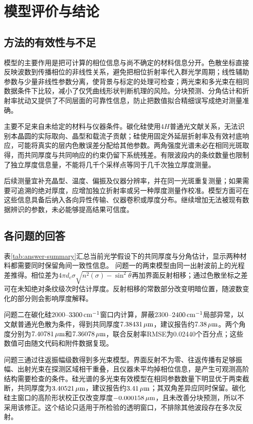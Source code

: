 \section{模型评价与结论}
\subsection{方法的有效性与不足}
模型的主要作用是把可计算的相位信息与尚不确定的材料信息分开。色散坐标直接反映波数到传播相位的非线性关系，避免把相位折射率代入群光学周期；线性辅助参数与少量非线性参数分离，使背景与标定的处理可检查；两光束和多光束在相同数据条件下比较，减小了仅凭曲线形状判断机理的风险。分块预测、分角估计和折射率扰动又提供了不同层面的可靠性信息，防止把数值拟合精细误写成绝对测量准确。

主要不足来自未给定的材料与仪器条件。碳化硅使用$4H$普通光文献关系，无法识别本晶圆的实际取向、晶型和载流子贡献；硅使用固定外延层折射率及有效衬底响应，可能将真实的层内色散误差分配给其他参数。两角强度光谱未必在相同光斑取得，而共同厚度与共同响应的约束仍留下系统残差。有限波段内的条纹数量也限制了独立厚度信息量，不能将几千个采样点等同于几千次独立厚度测量。

后续测量宜补充晶型、温度、偏振及仪器分辨率，并在同一光斑重复测量；如果需要可追溯的绝对厚度，应增加独立折射率或另一种厚度测量作校准。模型方面可在这些信息具备后纳入各向异性传输、仪器卷积或厚度分布。继续增加无法被现有数据辨识的参数，未必能够提高结果可信度。

\subsection{各问题的回答}

表\ref{tab:answer-summary}汇总当前光学假设下的共同厚度与分角估计，显示两种材料都需要同时保留角间一致性信息。
问题一的两束模型由同一出射波前上的光程差推得。相位差为$4\pi d_c\sigma\sqrt{n^2(\sigma)-\sin^2\theta}$再加界面反射相移；通过色散坐标之差可在未知绝对条纹级次时估计厚度。反射相移的常数部分改变明暗位置，随波数变化的部分则会影响厚度解释。

问题二在碳化硅$2000$--$3300\,\mathrm{cm}^{-1}$窗口内计算，屏蔽$2300$--$2400\,\mathrm{cm}^{-1}$局部异常，以文献普通光色散为条件，得到共同厚度$7.38431\,\mu\mathrm{m}$，建议报告约$7.38\,\mu\mathrm{m}$。两个角度分别为$7.40781\,\mu\mathrm{m}$和$7.36078\,\mu\mathrm{m}$，联合反射率RMSE为0.02440个百分点；这些数值可由随文代码和附件数据复现。

问题三通过往返振幅级数得到多光束模型。界面反射不为零、往返传播有足够振幅、出射光束在探测区域相干重叠，且仪器未平均掉相位信息，是产生可观测高阶结构需要检查的条件。硅光谱的多光束有效模型在相同参数数量下明显优于两束截断，共同厚度为$3.40521\,\mu\mathrm{m}$，建议报告约$3.41\,\mu\mathrm{m}$；其双角差异应同时保留。碳化硅主窗口的高阶形状校正仅改变厚度$-0.000158\,\mu\mathrm{m}$，且未改善分块预测，所以不采用该修正。这个结论只适用于所检验的透明窗口，不排除其他波段存在多次反射。
